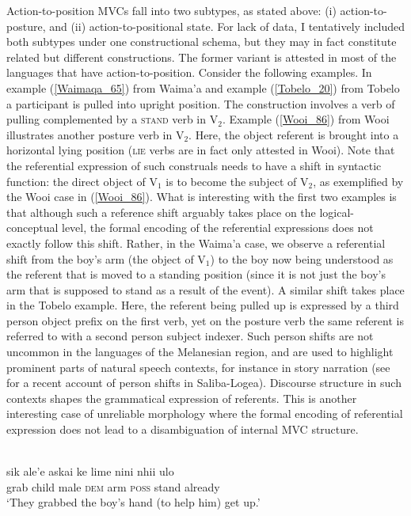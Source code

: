 Action-to-position MVCs fall into two subtypes, as stated above: (i) action-to-posture, and (ii) action-to-positional state. For lack of data, I tentatively included both subtypes under one constructional schema, but they may in fact constitute related but different constructions. The former variant is attested in most of the languages that have action-to-position. Consider the following examples. In example (\ref{Waimaqa_65}) from Waima'a and example (\ref{Tobelo_20}) from Tobelo a participant is pulled into upright position. The construction involves a verb of pulling complemented by a \textsc{stand} verb in V$_2$. Example (\ref{Wooi_86}) from Wooi illustrates another posture verb in V$_2$. Here, the object referent is brought into a horizontal lying position (\textsc{lie} verbs are in fact only attested in Wooi). Note that the referential expression of such construals needs to have a shift in syntactic function: the direct object of V$_1$ is to become the subject of V$_2$, as exemplified by the Wooi case in (\ref{Wooi_86}). What is interesting with the first two examples is that although such a reference shift arguably takes place on the logical-conceptual level, the formal encoding of the referential expressions does not exactly follow this shift. Rather, in the Waima'a case, we observe a referential shift from the boy's arm (the object of V$_1$) to the boy now being understood as the referent that is moved to a standing position (since it is not just the boy's arm that is supposed to stand as a result of the event). A similar shift takes place in the Tobelo example. Here, the referent being pulled up is expressed by a third person object prefix on the first verb, yet on the posture verb the same referent is referred to with a second person subject indexer. Such person shifts are not uncommon in the languages of the Melanesian region, and are used to highlight prominent parts of natural speech contexts, for instance in story narration (see \citealt{margetts2015person} for a recent account of person shifts in Saliba-Logea). Discourse structure in such contexts shapes the grammatical expression of referents. This is another interesting case of unreliable morphology where the formal encoding of referential expression does not lead to a disambiguation of internal MVC structure.

\ea \label{Waimaqa_65}
\\
\gll sik ale'e askai ke lime nini nhii ulo \\
grab child male \textsc{dem} arm \textsc{poss} stand already \\
\glft `They grabbed the boy's hand (to help him) get
up.'\\ 
\z

